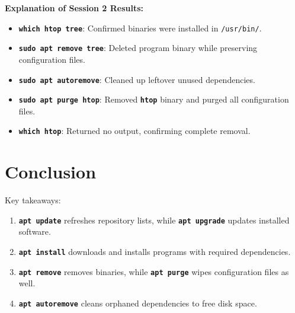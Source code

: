 \documentclass[10pt,a4paper]{article}
\newcommand{\cmd}[1]{\texttt{\textbf{#1}}}
\begin{document}
\vspace{2pt}\noindent\textbf{Explanation of Session 2 Results:}\par\vspace{1pt}
\begin{itemize}[noitemsep,topsep=1pt,leftmargin=1.2em]
  \item \cmd{which htop tree}: Confirmed binaries were installed in \texttt{/usr/bin/}.
  \item \cmd{sudo apt remove tree}: Deleted program binary while preserving configuration files.
  \item \cmd{sudo apt autoremove}: Cleaned up leftover unused dependencies.
  \item \cmd{sudo apt purge htop}: Removed \cmd{htop} binary and purged all configuration files.
  \item \cmd{which htop}: Returned no output, confirming complete removal.
\end{itemize}

\section{Conclusion}
Key takeaways:
\begin{enumerate}[noitemsep,topsep=1pt,leftmargin=1.4em]
  \item \cmd{apt update} refreshes repository lists, while \cmd{apt upgrade} updates installed software.
  \item \cmd{apt install} downloads and installs programs with required dependencies.
  \item \cmd{apt remove} removes binaries, while \cmd{apt purge} wipes configuration files as well.
  \item \cmd{apt autoremove} cleans orphaned dependencies to free disk space.
\end{enumerate}
\end{document}

